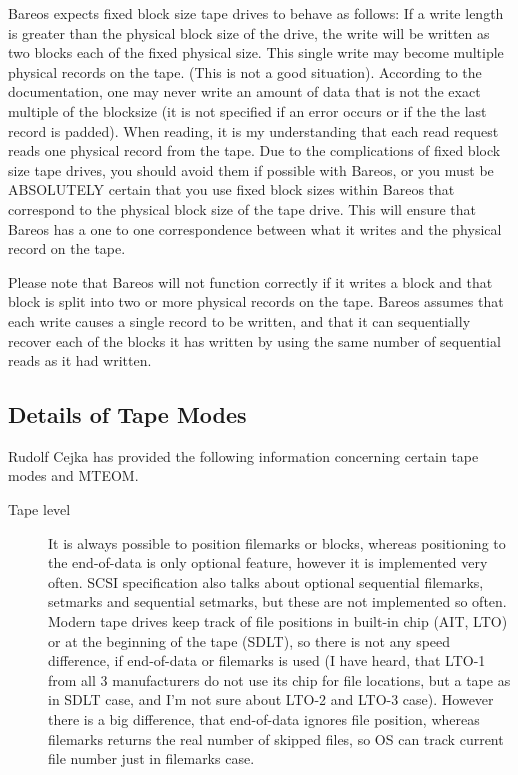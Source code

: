 {Bareos expects fixed block size tape drives to behave as follows: If a write
length is greater than the physical block size of the drive, the write will be
written as two blocks each of the fixed physical size. This single write may
become multiple physical records on the tape. (This is not a good situation).
According to the documentation, one may never write an amount of data that is
not the exact multiple of the blocksize (it is not specified if an error
occurs or if the the last record is padded). When reading, it is my
understanding that each read request reads one physical record from the tape.
Due to the complications of fixed block size tape drives, you should avoid
them if possible with Bareos, or you must be ABSOLUTELY certain that you use
fixed block sizes within Bareos that correspond to the physical block size of
the tape drive. This will ensure that Bareos has a one to one correspondence
between what it writes and the physical record on the tape.

Please note that Bareos will not function correctly if it writes a block and
that block is split into two or more physical records on the tape. Bareos
assumes that each write causes a single record to be written, and that it can
sequentially recover each of the blocks it has written by using the same
number of sequential reads as it had written.

\subsection{Details of Tape Modes}
Rudolf Cejka has provided the following information concerning
certain tape modes and MTEOM.

\begin{description}
\item[Tape level]
  It is always possible to position filemarks or blocks, whereas
  positioning to the end-of-data is only optional feature, however it is
  implemented very often.  SCSI specification also talks about optional
  sequential filemarks, setmarks and sequential setmarks, but these are not
  implemented so often.  Modern tape drives keep track of file positions in
  built-in chip (AIT, LTO) or at the beginning of the tape (SDLT), so there
  is not any speed difference, if end-of-data or filemarks is used (I have
  heard, that LTO-1 from all 3 manufacturers do not use its chip for file
  locations, but a tape as in SDLT case, and I'm not sure about LTO-2 and
  LTO-3 case).  However there is a big difference, that end-of-data ignores
  file position, whereas filemarks returns the real number of skipped
  files, so OS can track current file number just in filemarks case.


\end{description}}
